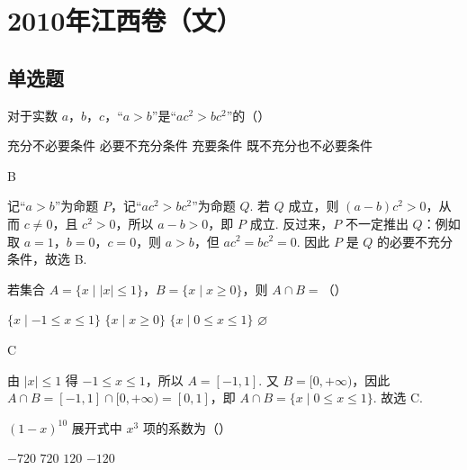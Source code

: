 
\chapter{2010年江西卷（文）}

\section{单选题}

\begin{problem}
对于实数 \(a\)，\(b\)，\(c\)，“\(a > b\)”是“\(ac^2 > bc^2\)”的（\quad）

\choices
    {充分不必要条件}
    {必要不充分条件}
    {充要条件}
    {既不充分也不必要条件}
\end{problem}

\begin{answer}
B
\end{answer}

\begin{solution}
记“\(a>b\)”为命题 \(P\)，记“\(ac^{2}>bc^{2}\)”为命题 \(Q\). 若 \(Q\) 成立，则 \(\left(a-b\right)c^{2}>0\)，从而 \(c\ne0\)，且 \(c^{2}>0\)，所以 \(a-b>0\)，即 \(P\) 成立. 反过来，\(P\) 不一定推出 \(Q\)：例如取 \(a=1\)，\(b=0\)，\(c=0\)，则 \(a>b\)，但 \(ac^{2}=bc^{2}=0\). 因此 \(P\) 是 \(Q\) 的必要不充分条件，故选 B.
\end{solution}

\begin{problem}
若集合 \(A = \{x \mid |x| \leqslant 1\}\)，\(B = \{x \mid x \geqslant 0\}\)，则 \(A \cap B =\)（\quad）

\choices
    {\(\{x \mid -1 \leqslant x \leqslant 1\}\)}
    {\(\{x \mid x \geqslant 0\}\)}
    {\(\{x \mid 0 \leqslant x \leqslant 1\}\)}
    {\(\varnothing\)}
\end{problem}

\begin{answer}
C
\end{answer}

\begin{solution}
由 \(\lvert x\rvert\leqslant1\) 得 \(-1\leqslant x\leqslant1\)，所以 \(A=[-1,1]\). 又 \(B=[0,+\infty)\)，因此 \(A\cap B=[-1,1]\cap[0,+\infty)=[0,1]\)，即 \(A\cap B=\{x\mid0\leqslant x\leqslant1\}\). 故选 C.
\end{solution}

\begin{problem}
\((1 - x)^{10}\) 展开式中 \(x^{3}\) 项的系数为（\quad）

\choices
    {\(-720\)}
    {\(720\)}
    {\(120\)}
    {\(-120\)}
\end{problem}


